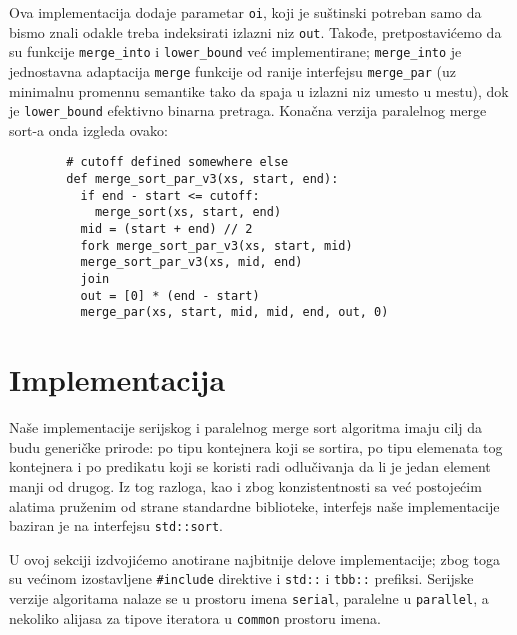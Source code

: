\documentclass[a4paper,11pt]{article}
\begin{document}
    Ova implementacija dodaje parametar \verb|oi|, koji je suštinski potreban samo da bismo
    znali odakle treba indeksirati izlazni niz \verb|out|. Takođe, pretpostavićemo da su funkcije
    \verb|merge_into| i \verb|lower_bound| već implementirane; \verb|merge_into| je jednostavna
    adaptacija \verb|merge| funkcije od ranije interfejsu \verb|merge_par|
    (uz minimalnu promennu semantike tako da spaja u izlazni niz umesto u mestu),
    dok je \verb|lower_bound| efektivno binarna pretraga. Konačna verzija paralelnog merge sort-a
    onda izgleda ovako:
    \begin{verbatim}
        # cutoff defined somewhere else
        def merge_sort_par_v3(xs, start, end):
          if end - start <= cutoff:
            merge_sort(xs, start, end)
          mid = (start + end) // 2
          fork merge_sort_par_v3(xs, start, mid)
          merge_sort_par_v3(xs, mid, end)
          join
          out = [0] * (end - start)
          merge_par(xs, start, mid, mid, end, out, 0)
    \end{verbatim}
    \newpage

    \section{Implementacija}
    Naše implementacije serijskog i paralelnog merge sort algoritma imaju cilj da
    budu generičke prirode: po tipu kontejnera koji se sortira, po tipu elemenata
    tog kontejnera i po predikatu koji se koristi radi odlučivanja da li je jedan
    element manji od drugog. Iz tog razloga, kao i zbog konzistentnosti sa već postojećim
    alatima pruženim od strane standardne biblioteke, interfejs naše implementacije
    baziran je na interfejsu \verb|std::sort|.\par
    U ovoj sekciji izdvojićemo anotirane najbitnije delove implementacije; zbog toga su
    većinom izostavljene \verb|#include| direktive i \verb|std::| i \verb|tbb::|
    prefiksi. Serijske verzije algoritama nalaze se u prostoru imena \verb|serial|,
    paralelne u \verb|parallel|, a nekoliko alijasa za tipove iteratora u \verb|common|
    prostoru imena.
\end{document}
